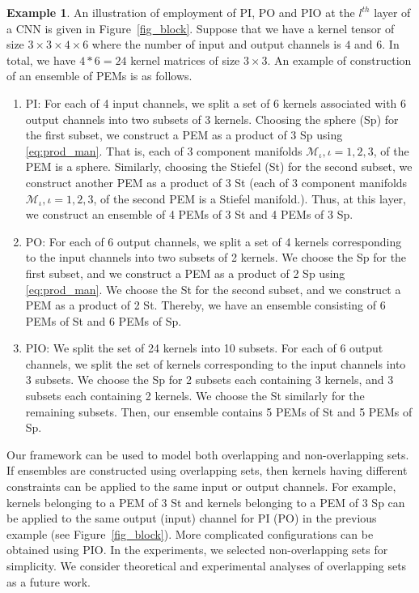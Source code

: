 \documentclass[10pt,journal,compsoc]{IEEEtran}
\theoremstyle{definition}
\theoremstyle{definition}
\newtheorem{example}[theorem]{Example}
\theoremstyle{remark}
\theoremstyle{remark}
\theoremstyle{remark}
\begin{document}
   
\begin{example}
An illustration of employment of PI, PO and PIO at the $l^{th}$ layer of a CNN is given in Figure~\ref{fig_block}. Suppose that we have a kernel tensor of size $3 \times 3 \times 4 \times 6$ where the number of input and output channels is $4$ and $6$. In total, we have ${4*6=24}$ kernel matrices of size $3 \times 3$. An example of construction of an ensemble of PEMs is as follows. 
\begin{enumerate}[leftmargin=*] %
\item PI: For each of 4 input channels, we split a set of 6 kernels associated with 6 output channels into two subsets of 3 kernels. Choosing the sphere (Sp) for the first subset, we construct a PEM  as a product of 3 Sp using \eqref{eq:prod_man}. That is, each of 3 component manifolds ${\mathcal{M}_{\iota}}, {\iota  = 1,2,3}$, of the PEM is a sphere. Similarly, choosing the Stiefel (St) for the second subset, we construct another PEM as a product of 3 St (each of 3 component manifolds ${\mathcal{M}_{\iota}}, \iota  = 1,2,3$, of the second PEM is a Stiefel manifold.). Thus, at this layer, we construct an ensemble of 4 PEMs of 3 St and 4 PEMs of 3 Sp.
\item PO: For each of 6 output channels, we split a set of 4 kernels corresponding to the input channels into two subsets of 2 kernels. We choose the Sp for the first subset, and we construct a PEM as a product of 2 Sp using \eqref{eq:prod_man}. We choose the St for the second subset, and we construct a PEM as a product of 2 St. Thereby, we have an ensemble consisting of 6 PEMs of St and 6 PEMs of Sp.
\item PIO: We split the set of 24 kernels into 10 subsets. For each of 6 output channels, we split the set of kernels corresponding to the input channels into 3 subsets. We choose the Sp for 2 subsets each containing 3 kernels, and 3 subsets each containing 2 kernels. We choose the St similarly for the remaining subsets. Then, our ensemble contains 5 PEMs of St and 5 PEMs of Sp.
\end{enumerate}
\end{example}
Our framework can be used to model both overlapping and non-overlapping sets. If ensembles are constructed using overlapping sets, then kernels having different constraints can be applied to the same input or output channels. For example, kernels belonging to a PEM of 3 St and kernels belonging to a PEM of 3 Sp can be applied to the same output (input) channel for PI (PO) in the previous example (see Figure~\ref{fig_block}). More complicated configurations can be obtained using PIO. In the experiments, we selected non-overlapping sets for simplicity. We consider theoretical and experimental analyses of overlapping sets as a future work.
\end{document}
